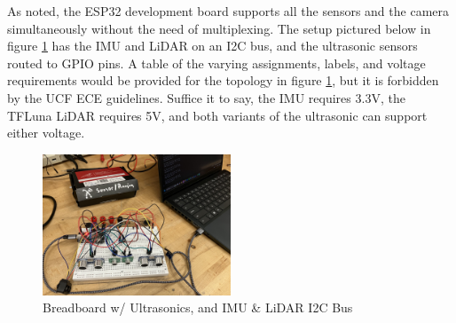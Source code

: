 \noindent As noted, the ESP32 development board supports all the sensors and the camera simultaneously without the need of multiplexing. The setup pictured below in figure \ref{fig:bb-test} has the IMU and LiDAR on an I2C bus, and the ultrasonic sensors routed to GPIO pins. A table of the varying assignments, labels, and voltage requirements would be provided for the topology in figure \ref{fig:bb-test}, but it is forbidden by the UCF ECE guidelines. Suffice it to say, the IMU requires 3.3V, the TFLuna LiDAR requires 5V, and both variants of the ultrasonic can support either voltage.\\
\begin{figure}[H]
	\centering
	\includegraphics[width=0.5\textwidth]{./Images/breadboard-test.jpg}
	\caption{\label{fig:bb-test}Breadboard w/ Ultrasonics, and IMU \& LiDAR I2C Bus}
\end{figure}
